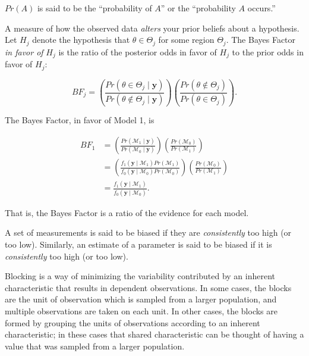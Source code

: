 \documentclass[
  letterpaper,
  DIV=11,
  numbers=noendperiod]{scrreprt}
\providecommand{\tightlist}{%
  \setlength{\itemsep}{0pt}\setlength{\parskip}{0pt}}\usepackage{longtable,booktabs,array}
\theoremstyle{definition}
\theoremstyle{plain}
\theoremstyle{definition}
\theoremstyle{remark}
\begin{document}
\(Pr(A)\) is said to be the ``probability of \(A\)'' or the
``probability \(A\) occurs.''

\begin{description}
\tightlist
\item[Bayes Factor (Definition~\ref{def-bayes-factor})]
A measure of how the observed data \emph{alters} your prior beliefs
about a hypothesis. Let \(H_j\) denote the hypothesis that
\(\theta \in \Theta_j\) for some region \(\Theta_j\). The Bayes Factor
\emph{in favor of} \(H_j\) is the ratio of the posterior odds in favor
of \(H_j\) to the prior odds in favor of \(H_j\):
\end{description}

\[BF_j = \left(\frac{Pr\left(\theta \in \Theta_j \mid \mathbf{y}\right)}{Pr\left(\theta \notin \Theta_j \mid \mathbf{y}\right)}\right)\left(\frac{Pr\left(\theta \notin \Theta_j\right)}{Pr\left(\theta \in \Theta_j\right)}\right).\]

\begin{description}
\tightlist
\item[Bayes Factor for Model Comparison
(Definition~\ref{def-bayes-factor-models})]
The Bayes Factor, in favor of Model 1, is
\end{description}

\[
\begin{aligned}
  BF_{1} &= \left(\frac{Pr(\mathcal{M}_1 \mid \mathbf{y})}{Pr(\mathcal{M}_0 \mid \mathbf{y})}\right)\left(\frac{Pr(\mathcal{M}_0)}{Pr(\mathcal{M}_1)}\right) \\
    &= \left(\frac{f_1(\mathbf{y} \mid \mathcal{M}_1) Pr(\mathcal{M}_1)}{f_0(\mathbf{y} \mid \mathcal{M}_0) Pr(\mathcal{M}_0)}\right)\left(\frac{Pr(\mathcal{M}_0)}{Pr(\mathcal{M}_1)}\right) \\
    &= \frac{f_1(\mathbf{y} \mid \mathcal{M}_1)}{f_0(\mathbf{y} \mid \mathcal{M}_0)}.
\end{aligned}
\]

That is, the Bayes Factor is a ratio of the evidence for each model.

\begin{description}
\tightlist
\item[Bias (Definition~\ref{def-bias})]
A set of measurements is said to be biased if they are
\emph{consistently} too high (or too low). Similarly, an estimate of a
parameter is said to be biased if it is \emph{consistently} too high (or
too low).
\item[Blocking (Definition~\ref{def-blocking})]
Blocking is a way of minimizing the variability contributed by an
inherent characteristic that results in dependent observations. In some
cases, the blocks are the unit of observation which is sampled from a
larger population, and multiple observations are taken on each unit. In
other cases, the blocks are formed by grouping the units of observations
according to an inherent characteristic; in these cases that shared
characteristic can be thought of having a value that was sampled from a
larger population.
\end{description}
\end{document}
